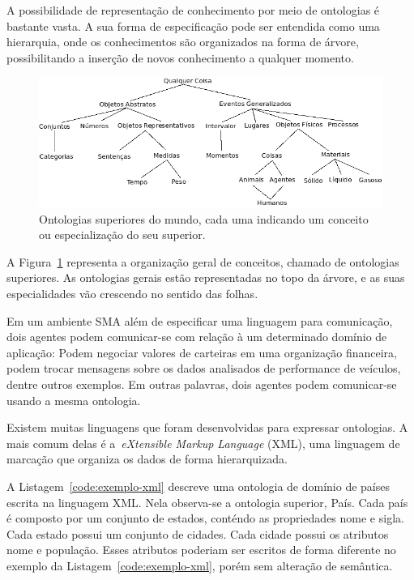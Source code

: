 A possibilidade de representação de conhecimento por meio de ontologias é bastante vasta. A sua forma de especificação pode ser entendida como uma hierarquia, onde os conhecimentos são organizados na forma de árvore, possibilitando a inserção de novos conhecimento a qualquer momento.

\begin{figure}
	\centering
	\includegraphics[scale=0.65]{images/arvore-ontologia.png}
	\caption{Ontologias superiores do mundo, cada uma indicando um conceito ou especialização do seu superior.}
	\label{fig:arvore-ontologia}
\end{figure}

A Figura~\ref{fig:arvore-ontologia} representa a organização geral de conceitos, chamado de ontologias superiores. As ontologias gerais estão representadas no topo da árvore, e as suas especialidades vão crescendo no sentido das folhas.

Em um ambiente SMA além de especificar uma linguagem para comunicação, dois agentes podem comunicar-se com relação à um determinado domínio de aplicação: Podem negociar valores de carteiras em uma organização financeira, podem trocar mensagens sobre os dados analisados de performance de veículos, dentre outros exemplos. Em outras palavras, dois agentes podem comunicar-se usando a mesma ontologia.

Existem muitas linguagens que foram desenvolvidas para expressar ontologias. A mais comum delas é a~\emph{eXtensible Markup Language} (XML), uma linguagem de marcação que organiza os dados de forma hierarquizada.

A Listagem~\ref{code:exemplo-xml} descreve uma ontologia de domínio de países escrita na linguagem XML. Nela observa-se a ontologia superior, País. Cada país é composto por um conjunto de estados, conténdo as propriedades nome e sigla. Cada estado possui um conjunto de cidades. Cada cidade possui os atributos nome e população. Esses atributos poderiam ser escritos de forma diferente no exemplo da Listagem~\ref{code:exemplo-xml}, porém sem alteração de semântica.



